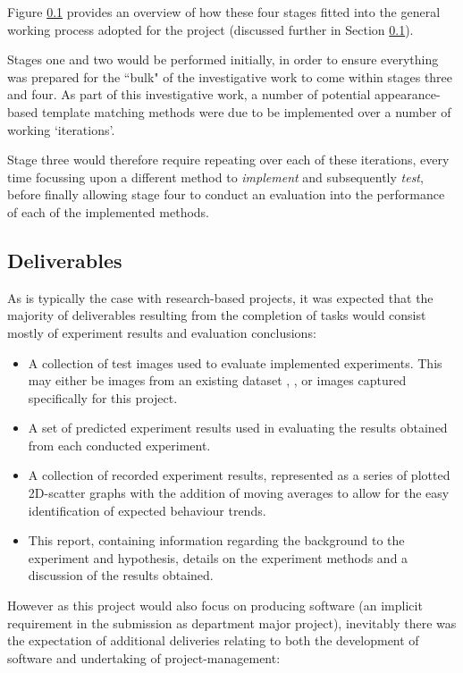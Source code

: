 Figure \ref{} provides an overview of how these four stages fitted into the general working process adopted for the project (discussed further in Section \ref{}). 

Stages one and two would be performed initially, in order to ensure everything was prepared for the ``bulk" of the investigative work to come within stages three and four. As part of this investigative work, a number of potential appearance-based template matching methods were due to be implemented over a number of working `iterations'. 

Stage three would therefore require repeating over each of these iterations, every time focussing upon a different method to \textit{implement} and subsequently \textit{test}, before finally allowing stage four to conduct an evaluation into the performance of each of the implemented methods.


\subsection{Deliverables}

As is typically the case with research-based projects, it was expected that the majority of deliverables resulting from the completion of tasks would consist mostly of experiment results and evaluation conclusions:

\begin{itemize}
	\item A collection of test images used to evaluate implemented experiments. This may either be images from an existing dataset \cite{ucl-dataset} \cite{baker-dataset}, \cite{mpi-dataset}, or images captured specifically for this project.
	\item A set of predicted experiment results used in evaluating the results obtained from each conducted experiment.
	\item A collection of recorded experiment results, represented as a series of plotted 2D-scatter graphs with the addition of moving averages to allow for the easy identification of expected behaviour trends.
	\item This report, containing information regarding the background to the experiment and hypothesis, details on the experiment methods and a discussion of the results obtained.
 \end{itemize}

However as this project would also focus on producing software (an implicit requirement in the submission as department major project), inevitably there was the expectation of additional deliveries relating to both the development of software and undertaking of project-management:

